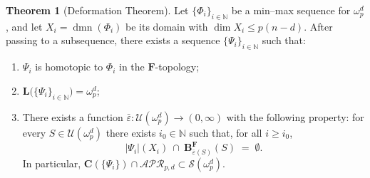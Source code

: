 \documentclass[12pt,english]{article}
\theoremstyle{definition}
\newtheorem{theorem}{Theorem}[section]
\begin{document}
\begin{theorem}[Deformation Theorem]\label{Thm:deform}
Let \(\{\Phi_i\}_{i\in\mathbb N}\) be a min--max sequence for \(\omega_p^d\), and let \(X_i=\operatorname{dmn}(\Phi_i)\) be its domain with \(\dim X_i\le p(n-d)\). After passing to a subsequence, there exists a sequence \(\{\Psi_i\}_{i\in\mathbb N}\) such that:
\begin{enumerate}
    \item \(\Psi_i\) is homotopic to \(\Phi_i\) in the \(\mathbf F\)-topology;
    \item \(\mathbf L\bigl(\{\Psi_i\}_{i\in\mathbb N}\bigr)=\omega^d_p\);
    \item There exists a function \(\bar\varepsilon:\mathcal U(\omega^d_p)\to(0,\infty)\) with the following property: for every \(S\in\mathcal U(\omega^d_p)\) there exists \(i_0\in\mathbb N\) such that, for all \(i\ge i_0\),
    \[
        \bigl|\Psi_i\bigr|(X_i)\ \cap\ \mathbf B^{\mathbf F}_{\bar\varepsilon(S)}(S)\;=\;\emptyset .
    \]
    In particular, \(\mathbf C(\{\Psi_i\})\cap \mathcal{APR}_{p,d} \subset \mathcal S(\omega^d_p)\).
\end{enumerate}
\end{theorem}
\end{document}
